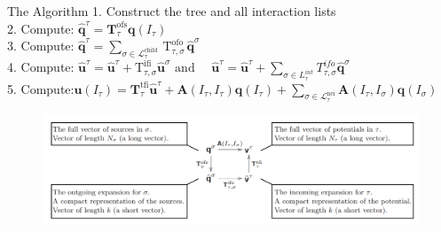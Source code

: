   \begin{frame}{The Algorithm}
  1. Construct the tree and all interaction lists\\
  \vspace{3mm}
  2. Compute: $\hat{\mathbf{q}}^{\tau}=\mathbf{T}_{\tau}^{\mathrm{ofs}} \mathbf{q}\left(I_{\tau}\right)$\\
  \vspace{3mm}
  3. Compute: $\hat{\mathbf{q}}^{\tau}=\sum_{\sigma \in \mathcal{L}_{\tau}^{\text {child }}} \mathrm{T}_{\tau, \sigma}^{\text {ofo }} \hat{\mathbf{q}}^{\sigma}$\\
  \vspace{3mm}
  4. Compute: $\hat{\mathbf{u}}^{\tau}=\hat{\mathbf{u}}^{\tau}+\mathrm{T}_{\tau, \sigma}^{\mathrm{ifi}} \hat{\mathbf{u}}^{\sigma} \text { and } \quad \hat{\boldsymbol{u}}^{\tau}=\hat{\boldsymbol{u}}^{\tau}+\sum_{\sigma \in L_{\tau}^{i n t}} T_{\tau, \sigma}^{i f o} \widehat{\boldsymbol{q}}^{\sigma}$\\
  \vspace{3mm}
  5. Compute:$\mathbf{u}\left(I_{\tau}\right)=\mathbf{T}_{\tau}^{\mathrm{tfi}}\hat{\mathbf{u}}^{\tau}+\mathbf{A}\left(I_{\tau}, I_{\tau}\right) \mathbf{q}\left(I_{\tau}\right)+\sum_{\sigma \in \mathcal{L}_{\tau}^{\mathrm{nei}}} \mathbf{A}\left(I_{\tau}, I_{\sigma}\right) \mathbf{q}\left(I_{\sigma}\right)$\\
  \vspace{3mm}
  \begin{figure}[htp]
      \includegraphics[width=22cm]{presentation/img/A_explanation.png}
      \label{fig:particles}
  \end{figure}

\end{frame}

